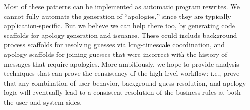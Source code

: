Most of these patterns can be implemented as automatic program rewrites.  We
cannot fully automate the generation of ``apologies,'' since they are typically
application-specific.  But we believe we can help there too, by generating code
scaffolds for apology generation and issuance.  These could include background
process scaffolds for resolving guesses via long-timescale coordination, and
apology scaffolds for joining guesses that were incorrect with the history of
messages that require apologies.  More ambitiously, we hope to provide analysis
techniques that can prove the consistency of the high-level workflow: i.e.,
prove that any combination of user behavior, background guess resolution, and
apology logic will eventually lead to a consistent resolution of the business
rules at both the user and system sides.
